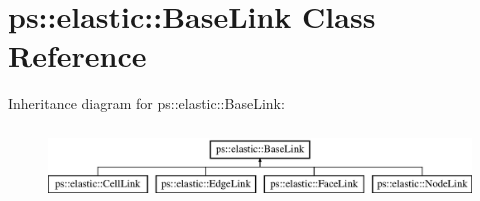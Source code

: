 \hypertarget{classps_1_1elastic_1_1BaseLink}{}\section{ps\+:\+:elastic\+:\+:Base\+Link Class Reference}
\label{classps_1_1elastic_1_1BaseLink}
Inheritance diagram for ps\+:\+:elastic\+:\+:Base\+Link\+:\begin{figure}[H]
\begin{center}
\leavevmode
\includegraphics[height=2.000000cm]{classps_1_1elastic_1_1BaseLink}
\end{center}
\end{figure}
